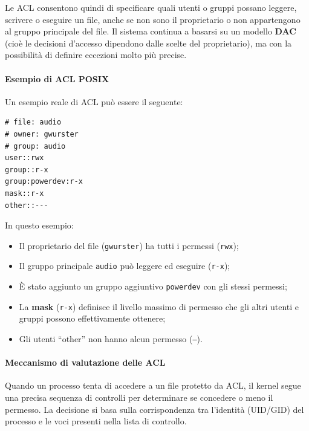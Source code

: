 Le ACL consentono quindi di specificare quali utenti o gruppi possano leggere, scrivere o eseguire un file, anche se non sono il proprietario o non appartengono al gruppo principale del file.
Il sistema continua a basarsi su un modello \textbf{DAC} (cioè le decisioni d’accesso dipendono dalle scelte del proprietario), ma con la possibilità di definire eccezioni molto più precise.

\paragraph{Esempio di ACL POSIX}
Un esempio reale di ACL può essere il seguente:
\begin{verbatim}
# file: audio
# owner: gwurster
# group: audio
user::rwx
group::r-x
group:powerdev:r-x
mask::r-x
other::---
\end{verbatim}
In questo esempio:
\begin{itemize}
  \item Il proprietario del file (\texttt{gwurster}) ha tutti i permessi (\texttt{rwx});
  \item Il gruppo principale \texttt{audio} può leggere ed eseguire (\texttt{r-x});
  \item È stato aggiunto un gruppo aggiuntivo \texttt{powerdev} con gli stessi permessi;
  \item La \textbf{mask} (\texttt{r-x}) definisce il livello massimo di permesso che gli altri utenti e gruppi possono effettivamente ottenere;
  \item Gli utenti “other” non hanno alcun permesso (\texttt{---}).
\end{itemize}

\paragraph{Meccanismo di valutazione delle ACL}
Quando un processo tenta di accedere a un file protetto da ACL, il kernel segue una precisa sequenza di controlli per determinare se concedere o meno il permesso.
La decisione si basa sulla corrispondenza tra l’identità (UID/GID) del processo e le voci presenti nella lista di controllo.

